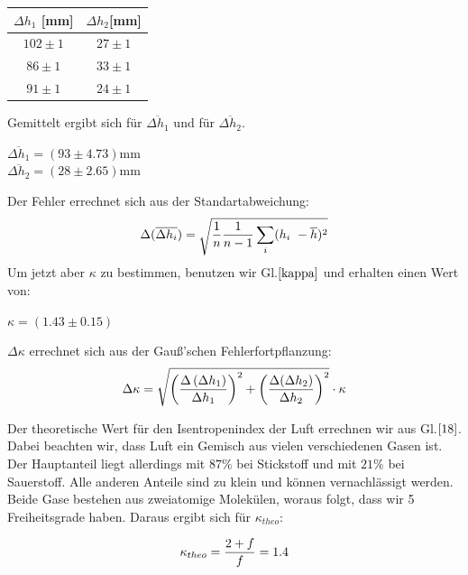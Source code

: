\documentclass{article}
\begin{document}
{{{\vspace{1cm}
\begin{center}
\begin{tabular}{c|c}
\(\Delta h_1\) [mm] & \(\Delta h_2\)[mm]\\
\hline
\(102 \pm 1\) & \(27\pm 1\)\\
\(86 \pm 1\) & \(33\pm 1\)\\
\(91 \pm 1\) & \(24\pm 1\)\\
\end{tabular}
\end{center}

\vspace{1cm}
Gemittelt ergibt sich für \(\overline{\Delta h_1}\) und für \(\overline{\Delta h_2}\).
\begin{center}
\(\overline{\Delta h_1} = (93\pm 4.73)\)mm\\
\(\overline{\Delta h_2} = (28\pm 2.65)\)mm
\end{center}

Der Fehler errechnet sich aus der Standartabweichung:
\begin{equation}
\notag
\Delta (\overline{\Delta h_i}) = \sqrt{\frac{1}{n}\frac{1}{n-1}\sum\limits_{i}(h_i \ - \overline{h})^2}
\end{equation}
\newpage
Um jetzt aber \(\kappa\) zu bestimmen, benutzen wir Gl.\(\eqref{kappa}\) und erhalten einen Wert von:

\begin{center}
\(\kappa = (1.43\pm 0.15)\)
\end{center}

\(\Delta\kappa\) errechnet sich aus der Gauß'schen Fehlerfortpflanzung:
\begin{equation}
\notag
\Delta\kappa = \sqrt{\left({\frac{\Delta \left(\Delta h_1\right)}{\Delta h_1}}\right)^2+\left(\frac{\Delta (\Delta h_2)}{\Delta h_2}\right)^2} \cdot\kappa
\end{equation}

Der theoretische Wert für den Isentropenindex der Luft errechnen wir aus Gl.\(\eqref{18}\). Dabei beachten wir, dass Luft ein Gemisch aus vielen verschiedenen Gasen ist. Der Hauptanteil liegt allerdings mit \(87\%\) bei Stickstoff und mit \(21\%\) bei Sauerstoff. Alle anderen Anteile sind zu klein und können vernachlässigt werden. Beide Gase bestehen aus zweiatomige Molekülen, woraus folgt, dass wir 5 Freiheitsgrade haben. Daraus ergibt sich für \(\kappa_{theo}\):

\begin{equation}
\notag
\kappa_{theo} = \frac{2+f}{f} = 1.4
\end{equation}
 
}}}
\end{document}
